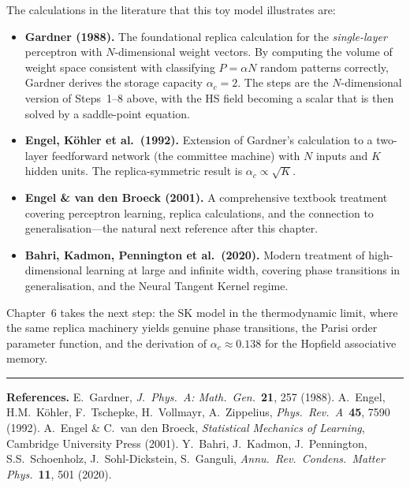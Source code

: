 \documentclass[nobib,justified]{tufte-handout}
\begin{document}
The calculations in the literature that this toy model illustrates are:

\begin{itemize}

\item \textbf{Gardner (1988).}  The foundational replica calculation
for the \emph{single-layer} perceptron with $N$-dimensional weight
vectors.  By computing the volume of weight space consistent with
classifying $P=\alpha N$ random patterns correctly, Gardner derives the
storage capacity $\alpha_c = 2$.  The steps are the $N$-dimensional
version of Steps~1--8 above, with the HS field becoming a scalar that
is then solved by a saddle-point equation.

\item \textbf{Engel, K\"{o}hler et al.\ (1992).}  Extension of
Gardner's calculation to a two-layer feedforward network (the committee
machine) with $N$ inputs and $K$ hidden units.  The replica-symmetric
result is $\alpha_c\propto\sqrt{K}$.

\item \textbf{Engel \& van den Broeck (2001).}  A comprehensive
textbook treatment covering perceptron learning, replica calculations,
and the connection to generalisation---the natural next reference after
this chapter.

\item \textbf{Bahri, Kadmon, Pennington et al.\ (2020).}  Modern
treatment of high-dimensional learning at large and infinite width,
covering phase transitions in generalisation, and the Neural Tangent Kernel
regime.

\end{itemize}

Chapter~6 takes the next step: the SK model in the thermodynamic
limit, where the same replica machinery yields genuine phase
transitions, the Parisi order parameter function, and the derivation of
$\alpha_c\approx 0.138$ for the Hopfield associative memory.

\bigskip
\noindent\rule{\linewidth}{0.4pt}
\smallskip
{\small
\textbf{References.}
E.\ Gardner,
\textit{J.\ Phys.\ A: Math.\ Gen.}\ \textbf{21}, 257 (1988).
A.\ Engel, H.M.\ K\"{o}hler, F.\ Tschepke, H.\ Vollmayr, A.\ Zippelius,
\textit{Phys.\ Rev.\ A}\ \textbf{45}, 7590 (1992).
A.\ Engel \& C.\ van den Broeck,
\textit{Statistical Mechanics of Learning},
Cambridge University Press (2001).
Y.\ Bahri, J.\ Kadmon, J.\ Pennington, S.S.\ Schoenholz,
J.\ Sohl-Dickstein, S.\ Ganguli,
\textit{Annu.\ Rev.\ Condens.\ Matter Phys.}\ \textbf{11}, 501 (2020).
}
\end{document}
